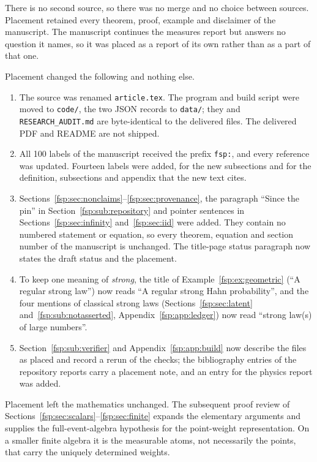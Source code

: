\documentclass[11pt,a4paper]{article}
\numberwithin{equation}{section}
\theoremstyle{definition}
\theoremstyle{remark}
\begin{document}
There is no second source, so there was no merge and no choice between sources.
Placement retained every theorem, proof, example and disclaimer of the
manuscript. The manuscript continues the measures report but answers no question it names, so
it was placed as a report of its own rather than as a part of that one.

Placement changed the following and nothing else.
\begin{enumerate}[label=(\alph*)]
\item The source was renamed \texttt{article.tex}. The program and build script
were moved to \texttt{code/}, the two JSON records to \texttt{data/}; they and
\texttt{RESEARCH\_AUDIT.md} are byte-identical to the delivered files. The
delivered PDF and README are not shipped.
\item All 100 labels of the manuscript received the prefix \texttt{fsp:}, and
every reference was updated. Fourteen labels were added, for the new
subsections and for the definition, subsections and appendix that the new text
cites.
\item Sections~\ref{fsp:sec:nonclaims}--\ref{fsp:sec:provenance}, the paragraph
``Since the pin'' in Section~\ref{fsp:sub:repository} and pointer sentences in
Sections~\ref{fsp:sec:infinity} and~\ref{fsp:sec:iid} were added. They contain no
numbered statement or equation, so every theorem, equation and section number of
the manuscript is unchanged. The title-page status paragraph now states the draft
status and the placement.
\item To keep one meaning of \emph{strong}, the title of
Example~\ref{fsp:ex:geometric} (``A regular strong law'') now reads ``A regular
strong Hahn probability'', and the four mentions of classical strong laws
(Sections~\ref{fsp:sec:latent} and~\ref{fsp:sub:notasserted}, Appendix~\ref{fsp:app:ledger}) now read
``strong law(s) of large numbers''.
\item Section~\ref{fsp:sub:verifier} and Appendix~\ref{fsp:app:build} now describe the files as placed
and record a rerun of the checks; the bibliography entries of the repository
reports carry a placement note, and an entry for the physics report was added.
\end{enumerate}
Placement left the mathematics unchanged. The subsequent proof review of
Sections~\ref{fsp:sec:scalars}--\ref{fsp:sec:finite} expands the elementary
arguments and supplies the full-event-algebra hypothesis for the point-weight
representation. On a smaller finite algebra it is the measurable atoms, not
necessarily the points, that carry the uniquely determined weights.
\end{document}
